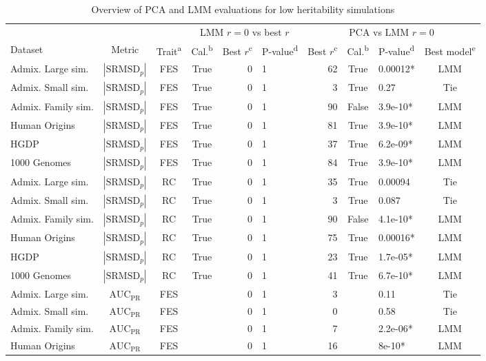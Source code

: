\documentclass[9pt,lineno]{elife}
\newcommand{\rmsd}{\text{SRMSD}_p}
\newcommand{\auc}{\text{AUC}_\text{PR}}
\begin{document}
\begin{table}[bt]
  \begin{fullwidth}
    \caption{Overview of PCA and LMM evaluations for low heritability simulations}
    \label{tab:human_sum_pcs_h3}
    \begin{tabular}{lcc|crl|rclc}
      \toprule
      & & & \multicolumn{3}{c|}{LMM $r=0$ vs best $r$} & \multicolumn{4}{c}{PCA vs LMM $r=0$} \\
      Dataset & Metric & {Trait\textsuperscript{a}} & {Cal.\textsuperscript{b}} & {Best $r$\textsuperscript{c}} & {P-value\textsuperscript{d}} & {Best $r$\textsuperscript{c}} & {Cal.\textsuperscript{b}} & {P-value\textsuperscript{d}} & {Best model\textsuperscript{e}} \\
      \midrule
      Admix. Large sim.	&$|\rmsd|$	&FES	&True	&0	&1	&62	&True	&0.00012*	&LMM \\
      Admix. Small sim.	&$|\rmsd|$	&FES	&True	&0	&1	&3	&True	&0.27	&Tie \\
      Admix. Family sim.	&$|\rmsd|$	&FES	&True	&0	&1	&90	&False	&3.9e-10*	&LMM \\
      Human Origins	&$|\rmsd|$	&FES	&True	&0	&1	&81	&True	&3.9e-10*	&LMM \\
      HGDP	&$|\rmsd|$	&FES	&True	&0	&1	&37	&True	&6.2e-09*	&LMM \\
      1000 Genomes	&$|\rmsd|$	&FES	&True	&0	&1	&84	&True	&3.9e-10*	&LMM \\
      Admix. Large sim.	&$|\rmsd|$	&RC	&True	&0	&1	&35	&True	&0.00094	&Tie \\
      Admix. Small sim.	&$|\rmsd|$	&RC	&True	&0	&1	&3	&True	&0.087	&Tie \\
      Admix. Family sim.	&$|\rmsd|$	&RC	&True	&0	&1	&90	&False	&4.1e-10*	&LMM \\
      Human Origins	&$|\rmsd|$	&RC	&True	&0	&1	&75	&True	&0.00016*	&LMM \\
      HGDP	&$|\rmsd|$	&RC	&True	&0	&1	&23	&True	&1.7e-05*	&LMM \\
      1000 Genomes	&$|\rmsd|$	&RC	&True	&0	&1	&41	&True	&6.7e-10*	&LMM \\
      Admix. Large sim.	&$\auc$	&FES	&	&0	&1	&3	&	&0.11	&Tie \\
      Admix. Small sim.	&$\auc$	&FES	&	&0	&1	&0	&	&0.58	&Tie \\
      Admix. Family sim.	&$\auc$	&FES	&	&0	&1	&7	&	&2.2e-06*	&LMM \\
      Human Origins	&$\auc$	&FES	&	&0	&1	&16	&	&8e-10*	&LMM \\

\end{tabular}
\end{fullwidth}
\end{table}
\end{document}

